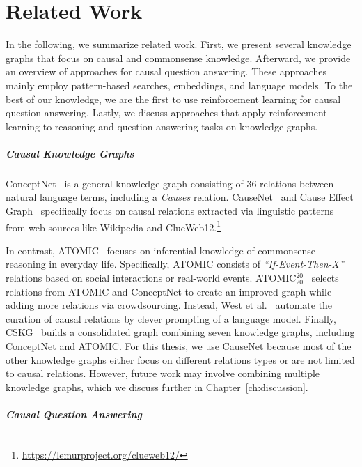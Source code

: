 %
\chapter{Related Work}
\label{ch:related-work}

In the following, we summarize related work. 
First, we present several knowledge graphs that focus on causal and commonsense knowledge. 
Afterward, we
provide an overview of approaches for causal question answering. These approaches mainly employ pattern-based searches, embeddings, and language models. 
To the best of our knowledge, we are the first to use reinforcement learning for causal question answering. Lastly, we discuss approaches that apply reinforcement learning to reasoning and 
question answering tasks on knowledge graphs.

\paragraph{Causal Knowledge Graphs}
ConceptNet~\cite{Speer2017ConceptNet} is a general knowledge graph consisting of 36 relations between natural language terms, 
including a \textit{Causes} relation. CauseNet~\cite{Heindorf2020Causenet} and Cause Effect Graph~\cite{Li2020CauseEffectGraph} 
specifically focus on causal relations extracted via linguistic patterns from web sources like Wikipedia and ClueWeb12.\footnote{\url{https://lemurproject.org/clueweb12/}}

In contrast, ATOMIC~\cite{Sap2019ATOMIC} focuses on inferential knowledge of commonsense reasoning in everyday life. Specifically, ATOMIC consists of \textit{``If-Event-Then-X''} relations based on social interactions or real-world events. 
ATOMIC$^{20}_{20}$~\cite{Hwang2021COMET} selects relations from ATOMIC and ConceptNet to create an improved graph while adding more relations via crowdsourcing. Instead, West et al.~\cite{West2021Symbolic} automate the curation of causal relations by clever prompting of a language model. Finally, CSKG~\cite{Ilievski2021CSKG} builds a consolidated graph combining seven knowledge graphs, including ConceptNet and ATOMIC.
For this thesis, we use CauseNet because most of the other knowledge graphs either focus on different relations types or are not limited to causal relations.
However, future work may involve combining multiple knowledge graphs, which we discuss further in Chapter~\ref{ch:discussion}.

\paragraph{Causal Question Answering}

